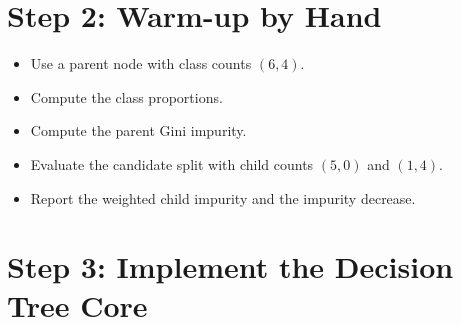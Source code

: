 \section*{Step 2: Warm-up by Hand}
\begin{itemize}
  \item Use a parent node with class counts $(6,4)$.
  \item Compute the class proportions.
  \item Compute the parent Gini impurity.
  \item Evaluate the candidate split with child counts $(5,0)$ and $(1,4)$.
  \item Report the weighted child impurity and the impurity decrease.
\end{itemize}

\section*{Step 3: Implement the Decision Tree Core}
